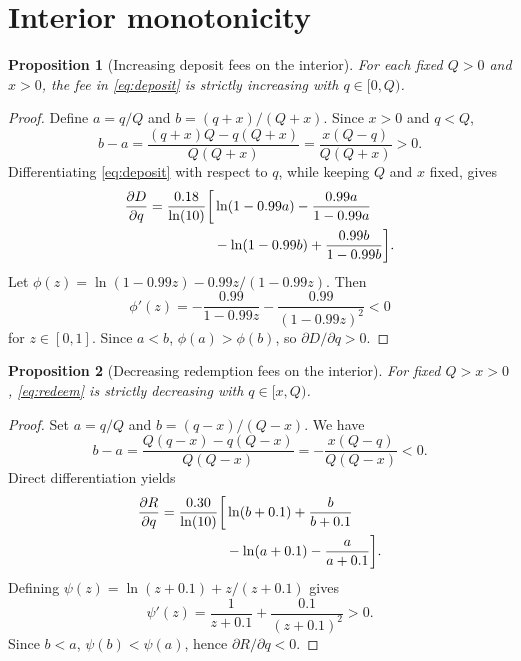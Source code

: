 \documentclass[11pt]{article}
\newtheorem{proposition}{Proposition}
\begin{document}
\section{Interior monotonicity}
\begin{proposition}[Increasing deposit fees on the interior]
For each fixed $Q>0$ and $x>0$, the fee in \eqref{eq:deposit} is strictly increasing with $q\in[0,Q)$.
\end{proposition}
\begin{proof}
Define $a=q/Q$ and $b=(q+x)/(Q+x)$. Since $x>0$ and $q<Q$,
\begin{equation}
b-a=\frac{(q+x)Q-q(Q+x)}{Q(Q+x)}=\frac{x(Q-q)}{Q(Q+x)}>0.
\end{equation}
Differentiating \eqref{eq:deposit} with respect to $q$, while keeping $Q$ and $x$ fixed, gives
\begin{align}
\frac{\partial D}{\partial q}=\frac{0.18}{\ln(10)}\bigg[
&\ln(1-0.99a)-\frac{0.99a}{1-0.99a}\\
&-\ln(1-0.99b)+\frac{0.99b}{1-0.99b}\bigg].\notag
\end{align}
Let $\phi(z)=\ln(1-0.99z)-0.99z/(1-0.99z)$. Then
\begin{equation}
\phi'(z)=-\frac{0.99}{1-0.99z}-\frac{0.99}{(1-0.99z)^2}<0
\end{equation}
for $z\in[0,1]$. Since $a<b$, $\phi(a)>\phi(b)$, so $\partial D/\partial q>0$.
\end{proof}

\begin{proposition}[Decreasing redemption fees on the interior]
For fixed $Q>x>0$, \eqref{eq:redeem} is strictly decreasing with $q\in[x,Q)$.
\end{proposition}
\begin{proof}
Set $a=q/Q$ and $b=(q-x)/(Q-x)$. We have
\begin{equation}
b-a=\frac{Q(q-x)-q(Q-x)}{Q(Q-x)}=-\frac{x(Q-q)}{Q(Q-x)}<0.
\end{equation}
Direct differentiation yields
\begin{align}
\frac{\partial R}{\partial q}=\frac{0.30}{\ln(10)}\bigg[
&\ln(b+0.1)+\frac{b}{b+0.1}\\
&-\ln(a+0.1)-\frac{a}{a+0.1}\bigg].\notag
\end{align}
Defining $\psi(z)=\ln(z+0.1)+z/(z+0.1)$ gives
\begin{equation}
\psi'(z)=\frac{1}{z+0.1}+\frac{0.1}{(z+0.1)^2}>0.
\end{equation}
Since $b<a$, $\psi(b)<\psi(a)$, hence $\partial R/\partial q<0$.
\end{proof}
\end{document}
